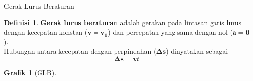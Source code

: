 \documentclass{beamer}
\theoremstyle{plain}
\theoremstyle{plain}
\theoremstyle{definition}
\newtheorem{defin}[teorema]{Definisi}
\newtheorem{grafik}[teorema]{Grafik}
\numberwithin{equation}{section}
\begin{document}
	\begin{frame}{Gerak Lurus Beraturan}
		
		\begin{defin}
			\small
			\justifying \noindent \textbf{Gerak lurus beraturan} adalah gerakan pada lintasan garis lurus dengan kecepatan konstan ($\boldsymbol{v} = \boldsymbol{v_0}$) dan percepatan yang sama dengan nol ($\boldsymbol{a} = \boldsymbol{0}$).
			\\ 
			\justifying \noindent Hubungan antara kecepatan dengan perpindahan ($\boldsymbol{\Delta s}$) dinyatakan sebagai 
			\begin{equation}
				\boldsymbol{\Delta s} = \boldsymbol{v} t
			\end{equation}
		\end{defin}
		
		\begin{grafik}[GLB]
			\begin{figure}[htb]
				\centering
				
				
				
				\begin{tikzpicture}[x=0.75pt,y=0.75pt,yscale=-1,xscale=1]
					

\end{tikzpicture}
\end{figure}
\end{grafik}
\end{frame}
\end{document}
